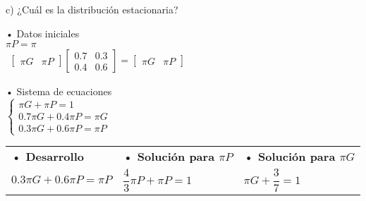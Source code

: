 \documentclass[a4paper, 12pt]{article}
\newcommand{\Aspace}{0.2cm}
\begin{document}
\begin{enumerate}
            \vspace{\Aspace} \par
            c) ¿Cuál es la distribución estacionaria?
            \\ { \color{azul} 
                • Datos iniciales \\
                $ \pi P = \pi $ \\
                \(
                    \begin{array}{cccc}
                        \begin{bmatrix}
                            \pi G   &   \pi P
                        \end{bmatrix}
                    
                        \begin{bmatrix}
                            0{.}7   &   0{.}3   \\
                            0{.}4   &   0{.}6
                        \end{bmatrix}

                        =

                        \begin{bmatrix}
                            \pi G   &   \pi P
                        \end{bmatrix}                   
                    \end{array}
                \)
                

                • Sistema de ecuaciones \\
                \(
                    \begin{cases}
                        \pi G + \pi P = 1                   \\
                        0{.}7 \pi G + 0{.}4 \pi P = \pi G   \\
                        0{.}3 \pi G + 0{.}6 \pi P = \pi P
                    \end{cases}
                \)

                \begin{flushleft}
                    \begin{tabular}{p{5cm} p{5cm} p{5cm}}
                        \textbf{• Desarrollo} &
                        \textbf{• Solución para $\pi P$} &
                        \textbf{• Solución para $\pi G$} \\
        
                        $0{.}3 \pi G + 0{.}6 \pi P = \pi P$ &
                        $\dfrac{4}{3} \pi P + \pi P = 1$ &
                        $\pi G + \dfrac{3}{7} = 1$ \\


\end{tabular}
\end{flushleft}}
\end{enumerate}
\end{document}
